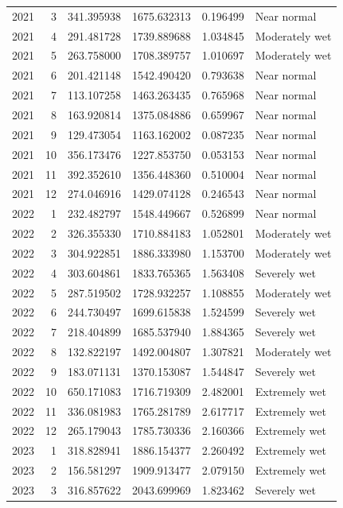 \begin{tabular}{rrrrrl}
2021 & 3 & 341.395938 & 1675.632313 & 0.196499 & Near normal \\
2021 & 4 & 291.481728 & 1739.889688 & 1.034845 & Moderately wet \\
2021 & 5 & 263.758000 & 1708.389757 & 1.010697 & Moderately wet \\
2021 & 6 & 201.421148 & 1542.490420 & 0.793638 & Near normal \\
2021 & 7 & 113.107258 & 1463.263435 & 0.765968 & Near normal \\
2021 & 8 & 163.920814 & 1375.084886 & 0.659967 & Near normal \\
2021 & 9 & 129.473054 & 1163.162002 & 0.087235 & Near normal \\
2021 & 10 & 356.173476 & 1227.853750 & 0.053153 & Near normal \\
2021 & 11 & 392.352610 & 1356.448360 & 0.510004 & Near normal \\
2021 & 12 & 274.046916 & 1429.074128 & 0.246543 & Near normal \\
2022 & 1 & 232.482797 & 1548.449667 & 0.526899 & Near normal \\
2022 & 2 & 326.355330 & 1710.884183 & 1.052801 & Moderately wet \\
2022 & 3 & 304.922851 & 1886.333980 & 1.153700 & Moderately wet \\
2022 & 4 & 303.604861 & 1833.765365 & 1.563408 & Severely wet \\
2022 & 5 & 287.519502 & 1728.932257 & 1.108855 & Moderately wet \\
2022 & 6 & 244.730497 & 1699.615838 & 1.524599 & Severely wet \\
2022 & 7 & 218.404899 & 1685.537940 & 1.884365 & Severely wet \\
2022 & 8 & 132.822197 & 1492.004807 & 1.307821 & Moderately wet \\
2022 & 9 & 183.071131 & 1370.153087 & 1.544847 & Severely wet \\
2022 & 10 & 650.171083 & 1716.719309 & 2.482001 & Extremely wet \\
2022 & 11 & 336.081983 & 1765.281789 & 2.617717 & Extremely wet \\
2022 & 12 & 265.179043 & 1785.730336 & 2.160366 & Extremely wet \\
2023 & 1 & 318.828941 & 1886.154377 & 2.260492 & Extremely wet \\
2023 & 2 & 156.581297 & 1909.913477 & 2.079150 & Extremely wet \\
2023 & 3 & 316.857622 & 2043.699969 & 1.823462 & Severely wet \\

\end{tabular}
